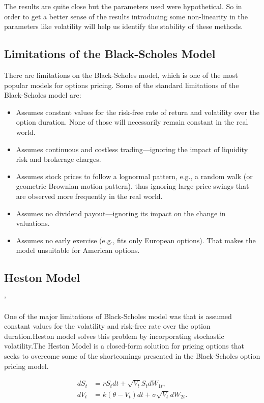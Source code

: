 \documentclass[12pt]{article}
\begin{document}
 The results are quite close but the parameters used were hypothetical. So in order to get a better sense of the results introducing some non-linearity in the parameters like volatility will help us identify the stability of these methods.
 
  \subsection{Limitations of the Black-Scholes Model}
  There are limitations on the Black-Scholes model, which is one of the most popular models for options pricing. Some of the standard limitations of the Black-Scholes model are:
 \begin{itemize}
  \item Assumes constant values for the risk-free rate of return and volatility over the option duration. None of those will necessarily remain constant in the real world.
  
  \item Assumes continuous and costless trading—ignoring the impact of liquidity risk and brokerage charges.
  
  \item Assumes stock prices to follow a lognormal pattern, e.g., a random walk (or geometric Brownian motion pattern), thus ignoring large price swings that are observed more frequently in the real world.
  
  \item Assumes no dividend payout—ignoring its impact on the change in valuations.
  
  \item Assumes no early exercise (e.g., fits only European options). That makes the model unsuitable for American options.
  \cite{seth_2022}
  \end{itemize}

\subsection{Heston Model}'

One of the major limitations of Black-Scholes model was that is assumed constant values for the volatility and risk-free rate over the option duration.Heston model solves this problem by incorporating stochastic volatility.The Heston Model is a closed-form solution for pricing options that seeks to overcome some of the shortcomings presented in the Black-Scholes option pricing model.

\begin{align}
	dS_t &= rS_tdt + \sqrt{V_t} S_t dW_{1t} , \\
	dV_t &= k(\theta - V_t)dt + \sigma \sqrt{V_t} dW_{2t}.
\end{align}
 
\end{document}
